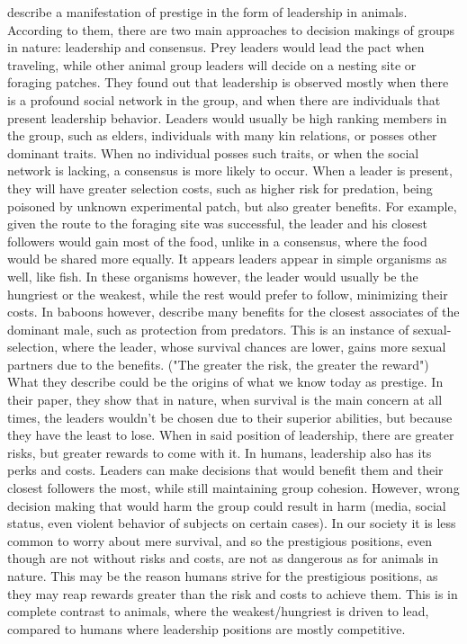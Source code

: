 \documentclass[11pt]{article}
\begin{document}
\citet{animal_leadership} describe a manifestation of prestige in the form of leadership in animals. According to them, there are two main approaches to decision makings of groups in nature: leadership and consensus. Prey leaders would lead the pact when traveling, while other animal group leaders will decide on a nesting site or foraging patches. They found out that leadership is observed mostly when there is a profound social network in the group, and when there are individuals that present leadership behavior. Leaders would usually be high ranking members in the group, such as elders, individuals with many kin relations, or posses other dominant traits. When no individual posses such traits, or when the social network is lacking, a consensus is more likely to occur.
When a leader is present, they will have greater selection costs, such as higher risk for predation, being poisoned by unknown experimental patch, but also greater benefits. For example, given the route to the foraging site was successful, the leader and his closest followers would gain most of the food, unlike in a consensus, where the food would be shared more equally.
It appears leaders appear in simple organisms as well, like fish. In these organisms however, the leader would usually be the hungriest or the weakest, while the rest would prefer to follow, minimizing their costs. In baboons however, \citet{animal_leadership} describe many benefits for the closest associates of the dominant male, such as protection from predators. This is an instance of sexual-selection, where the leader, whose survival chances are lower, gains more sexual partners due to the benefits. ("The greater the risk, the greater the reward")
What they describe could be the origins of what we know today as prestige. In their paper, they show that in nature, when survival is the main concern at all times, the leaders wouldn't be chosen due to their superior abilities, but because they have the least to lose. When in said position of leadership, there are greater risks, but greater rewards to come with it. 
In humans, leadership also has its perks and costs. Leaders can make decisions that would benefit them and their closest followers the most, while still maintaining group cohesion. However, wrong decision making that would harm the group could result in harm (media, social status, even violent behavior of subjects on certain cases).
In our society it is less common to worry about mere survival, and so the prestigious positions, even though are not without risks and costs, are not as dangerous as for animals in nature. This may be the reason humans strive for the prestigious positions, as they may reap rewards greater than the risk and costs to achieve them. This is in complete contrast to animals, where the weakest/hungriest is driven to lead, compared to humans where leadership positions are mostly competitive.\\
\end{document}
